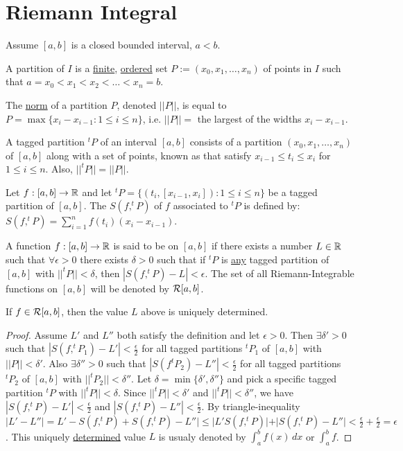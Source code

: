 \documentclass[]{article}
\begin{document}
\section*{Riemann Integral}

Assume $[a,b]$ is a closed bounded interval, $a<b$. 

\begin{definition}
	A partition of $I$ is a \ul{finite}, \ul{ordered} set $P := (x_0,x_1,\dots,x_n)$ of points in $I$ such that $a = x_0 < x_1 < x_2 < \dots < x_n = b$.
\end{definition}
\begin{definition}
	The \ul{norm} of a partition $P$, denoted $||P||$, is equal to $P = \max\{x_i - x_{i-1}: 1\leq i \leq n\}$, i.e. $||P|| =$ the largest of the widths $x_i - x_{i-1}$.
\end{definition}
\begin{definition}
	A tagged partition $^tP$ of an interval $[a,b]$ consists of a partition $(x_0,x_1,\dots,x_n)$ of $[a,b]$ along with a set of points, known as  that satisfy \ul{$x_{i-1} \leq t_i \leq x_i$} for $1\leq i \leq n$. Also, $||^tP|| = ||P||$.
\end{definition}
\begin{definition}
	Let $f:[a,b] \rightarrow \mathbb{R}$ and let $^tP = \{(t_i,[x_{i-1},x_i]): 1\leq i \leq n\}$ be a tagged partition of $[a,b]$. The  $S(f,^tP)$ of $f$ associated to $^tP$ is defined by: $S(f,^tP) = \sum_{i=1}^n f(t_i)(x_i - x_{i-1})$.
\end{definition}
\begin{definition}
	A function $f:[a,b] \rightarrow \mathbb{R}$ is said to be  on $[a,b]$ if there exists a number $L\in\mathbb{R}$ such that $\forall \epsilon>0$ there exists $\delta>0$ such that if $^tP$ is \ul{any} tagged partition of $[a,b]$ with $||^tP|| < \delta$, then $|S(f,^tP)-L| <\epsilon$. 
	The set of all Riemann-Integrable functions on $[a,b]$ will be denoted by $\mathcal{R}[a,b]$.
\end{definition}
\begin{theorem}
	If $f\in\mathcal{R}[a,b]$, then the value $L$ above is uniquely determined.
\end{theorem}
\begin{proof}
	Assume $L'$ and $L''$ both satisfy the definition and let $\epsilon>0$. Then $\exists \delta'>0$ such that $|S(f,^tP_1) - L'|<\frac{\epsilon}{2}$ for all tagged partitions $^tP_1$ of $[a,b]$ with $||P||<\delta'$. Also $\exists \delta''>0$ such that $|S(f^tP_2)-L''|<\frac{\epsilon}{2}$ for all tagged partitions $^tP_2$ of $[a,b]$ with $||^tP_2||<\delta''$. Let $\delta = \min\{\delta',\delta''\}$ and pick a specific tagged partition $^tP$ with $||^tP||<\delta$. Since $||^tP|| < \delta'$ and $||^tP||<\delta''$, we have $|S(f,^tP) - L'|< \frac{\epsilon}{2}$ and $|S(f,^tP)-L''|<\frac{\epsilon}{2}$. 
	By triangle-inequality $|L'-L''| = L' - S(f,^tP) + S(f,^tP) - L''| \leq |L' S(f,^tP)| + |S(f,^tP)-L''| < \frac{\epsilon}{2} + \frac{\epsilon}{2} = \epsilon$. This uniquely \ul{determined} value \ul{$L$} is usualy denoted by $\int_a^b f(x) \, dx$ or $\int_a^b f$. 
\end{proof}
\end{document}
